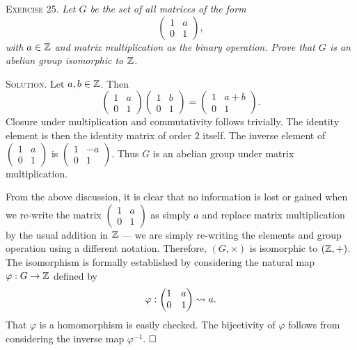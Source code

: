 \documentclass[11pt, leqno]{article}
\newcommand{\done}{\ensuremath{\hfill\square}}
\begin{document}
\textsc{Exercise 25}. \emph{Let $G$ be the set of all matrices of the form 
\begin{displaymath}
\begin{pmatrix} 1 & a \\ 0 & 1 \end{pmatrix},
\end{displaymath}
with $a\in\mathbb{Z}$ and matrix multiplication as the binary operation. Prove that $G$ is an abelian group isomorphic to $\mathbb{Z}$.}

\textsc{Solution}. Let $a, b \in \mathbb{Z}$. Then 
\begin{displaymath}
\begin{pmatrix} 1 & a \\ 0 & 1 \end{pmatrix} \begin{pmatrix} 1 & b \\ 0 & 1 \end{pmatrix} = \begin{pmatrix} 1 & a+b \\ 0 & 1 \end{pmatrix}.
\end{displaymath} Closure under multiplication and commutativity follows trivially. The identity element is then the identity matrix of order $2$ itself. The inverse element of $\displaystyle \begin{pmatrix} 1 & a \\ 0 & 1 \end{pmatrix}$ is $\displaystyle \begin{pmatrix} 1 & -a \\ 0 & 1 \end{pmatrix}$. Thus $G$ is an abelian group under matrix multiplication.

From the above discussion, it is clear that no information is lost or gained when we re-write the matrix $\displaystyle \begin{pmatrix} 1 & a \\ 0 & 1 \end{pmatrix}$ as simply $a$ and replace matrix multiplication by the usual addition in $\mathbb{Z}$ --- we are simply re-writing the elements and group operation using a different notation. Therefore, $(G, \times)$ is isomorphic to $(\mathbb{Z}, +)$. The isomorphism is formally established by considering the natural map $\varphi : G \to \mathbb{Z}$ defined by 
\begin{displaymath}
\varphi: \begin{pmatrix} 1 & a \\ 0 & 1 \end{pmatrix} \rightsquigarrow a.
\end{displaymath}
That $\varphi$ is a homomorphism is easily checked. The bijectivity of $\varphi$ follows from considering the inverse map $\varphi^{-1}$. \done
\end{document}
